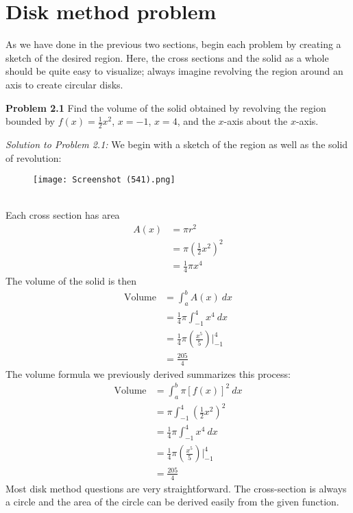 \documentclass[11pt]{scrartcl}
\begin{document}
\section{Disk method problem}
\noindent 
As we have done in the previous two sections, begin each problem by creating a sketch of the desired region. Here, the cross sections and the solid as a whole should be quite easy to visualize; always imagine revolving the region around an axis to create circular disks.  
\begin{tcolorbox}[colback=purple!5!white,colframe=purple!75!black]
\textbf{Problem 2.1} Find the volume of the solid obtained by revolving the region bounded by $f(x)=\frac{1}{2}x^2$, $x=-1$, $x=4$, and the $x$-axis about the $x$-axis. 
\end{tcolorbox}
\noindent 
\textit{Solution to Problem 2.1:} We begin with a sketch of the region as well as the solid of revolution: 
\begin{figure}[htp]
    \centering
    \texttt{[image: Screenshot (541).png]}
\end{figure}
\\
\noindent 
Each cross section has area 
\begin{align*}
    A(x) &=\pi r^2 \\
         &=\pi \left(\frac{1}{2}x^2\right)^2 \\
         &=\frac{1}{4}\pi x^4
\end{align*}
The volume of the solid is then 
\begin{align*}
    \text{Volume} &=\int_a^b A(x) \ dx \\
                  &= \frac{1}{4}\pi \int_{-1}^4 x^4 \ dx \\ 
                  &=\frac{1}{4}\pi \left(\frac{x^5}{5}\right) \biggr \rvert_{-1}^4 \\
                  &=\frac{205}{4}
\end{align*}
\noindent 
The volume formula we previously derived summarizes this process: 
\begin{align*}
    \text{Volume} &=\int_a^b{\pi [f(x)]^2 \ dx} \\
                  &=\pi \int_{-1}^4 \left( \frac{1}{2}x^2\right)^2 \\
                   &= \frac{1}{4}\pi \int_{-1}^4 x^4 \ dx \\
                  &=\frac{1}{4}\pi \left(\frac{x^5}{5}\right) \biggr \rvert_{-1}^4 \\
                  &=\frac{205}{4}
\end{align*}
\noindent
Most disk method questions are very straightforward. The cross-section is always a circle and the area of the circle can be derived easily from the given function. 
\end{document}
